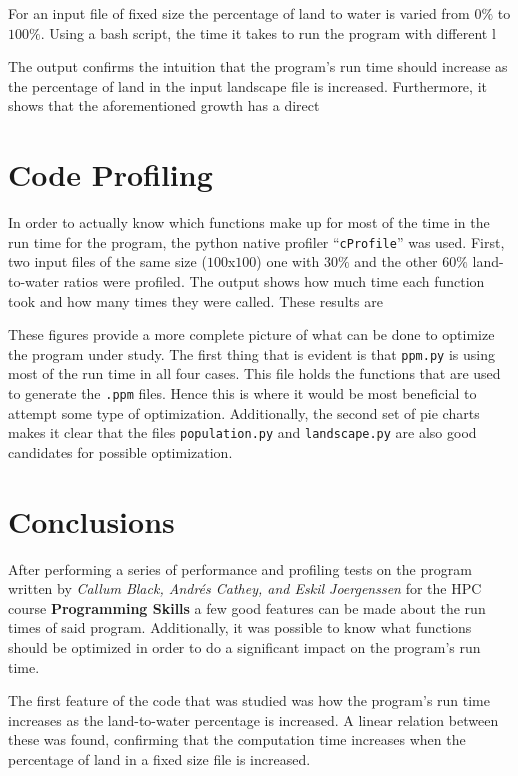 \documentclass[12pt,a4paper]{article}
\begin{document}
For an input file of fixed size the percentage of land to water is varied from 
$0\%$ to $100\%$. Using a bash script, the time it takes to run the program 
with different l


The output confirms the intuition that the program's run time should increase 
as the percentage of land in the input landscape file is increased. 
Furthermore, it shows that the aforementioned growth has a direct 




\section{Code Profiling}

In order to actually know which functions make up for most of the time in the 
run time for the program, the python native profiler ``\texttt{cProfile}'' was 
used. First, two input files of the same size ($100$x$100$) one with $30\%$ and 
the other $60\%$ land-to-water ratios were profiled. The output shows how much 
time each function took and how many times they were called. These results are 

These figures provide a more complete picture of what can be done to optimize 
the program under study. The first thing that is evident is that 
\texttt{ppm.py} is using most of the run time in all four cases. This file 
holds the functions that are used to generate the \texttt{.ppm} files. Hence 
this is where it would be most beneficial to attempt some type of 
optimization. Additionally, the second set of pie charts makes it clear that 
the files \texttt{population.py} and \texttt{landscape.py} are also good 
candidates for possible optimization.


\section{Conclusions}

After performing a series of performance and profiling tests on the program 
written by \textit{Callum Black, Andr\'es Cathey, and Eskil Joergenssen} for the 
HPC course \textbf{Programming Skills} a few good features can be made 
about the 
run times of said program. Additionally, it was possible to know what functions 
should be optimized in order to do a significant impact on the program's run 
time.

The first feature of the code that was studied was how the program's run time 
increases as the land-to-water percentage is increased. A linear relation 
between these was found, confirming that the computation time increases when 
the percentage of land in a fixed size file is increased. 
\end{document}
